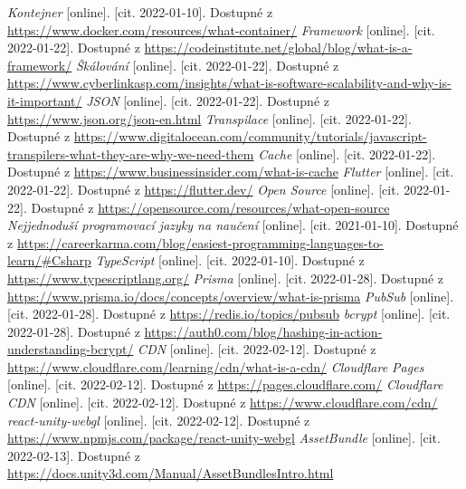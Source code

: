 \begin{thebibliography}{99}
     \textit{Kontejner} [online]. [cit. 2022-01-10]. Dostupné z \url{https://www.docker.com/resources/what-container/}
     \textit{Framework} [online]. [cit. 2022-01-22]. Dostupné z \url{https://codeinstitute.net/global/blog/what-is-a-framework/}
     \textit{Škálování} [online]. [cit. 2022-01-22]. Dostupné z \url{https://www.cyberlinkasp.com/insights/what-is-software-scalability-and-why-is-it-important/}
     \textit{JSON} [online]. [cit. 2022-01-22]. Dostupné z \url{https://www.json.org/json-en.html}
     \textit{Transpilace} [online]. [cit. 2022-01-22]. Dostupné z \url{https://www.digitalocean.com/community/tutorials/javascript-transpilers-what-they-are-why-we-need-them}
     \textit{Cache} [online]. [cit. 2022-01-22]. Dostupné z \url{https://www.businessinsider.com/what-is-cache}
     \textit{Flutter} [online]. [cit. 2022-01-22]. Dostupné z \url{https://flutter.dev/}
     \textit{Open Source} [online]. [cit. 2022-01-22]. Dostupné z \url{https://opensource.com/resources/what-open-source}
     \textit{Nejjednoduší programovací jazyky na naučení} [online]. [cit. 2021-01-10]. Dostupné z \url{https://careerkarma.com/blog/easiest-programming-languages-to-learn/#Csharp}
     \textit{TypeScript} [online]. [cit. 2022-01-10]. Dostupné z \url{https://www.typescriptlang.org/}
     \textit{Prisma} [online]. [cit. 2022-01-28]. Dostupné z \url{https://www.prisma.io/docs/concepts/overview/what-is-prisma}
     \textit{PubSub} [online]. [cit. 2022-01-28]. Dostupné z \url{https://redis.io/topics/pubsub}
     \textit{bcrypt} [online]. [cit. 2022-01-28]. Dostupné z \url{https://auth0.com/blog/hashing-in-action-understanding-bcrypt/}
     \textit{CDN} [online]. [cit. 2022-02-12]. Dostupné z \url{https://www.cloudflare.com/learning/cdn/what-is-a-cdn/}
     \textit{Cloudflare Pages} [online]. [cit. 2022-02-12]. Dostupné z \url{https://pages.cloudflare.com/}
     \textit{Cloudflare CDN} [online]. [cit. 2022-02-12]. Dostupné z \url{https://www.cloudflare.com/cdn/}
     \textit{react-unity-webgl} [online]. [cit. 2022-02-12]. Dostupné z \url{https://www.npmjs.com/package/react-unity-webgl}
     \textit{AssetBundle} [online]. [cit. 2022-02-13]. Dostupné z \url{https://docs.unity3d.com/Manual/AssetBundlesIntro.html}

\end{thebibliography}
